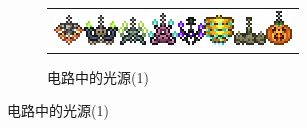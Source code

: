 \begin{figure}[!ht]
\begin{figure}[!htp]
{\begin{tabular}[b]{c}
\includegraphics{figures/Steampunk_Chandelier.png}\quad\includegraphics{figures/Blue_Dungeon_Chandelier.png}\quad\includegraphics{figures/Green_Dungeon_Chandelier.png}\quad\includegraphics{figures/Pink_Dungeon_Chandelier.png}\quad\includegraphics{figures/Obsidian_Chandelier.png}\quad\includegraphics{figures/Golden_Chandelier.png}\quad\includegraphics{figures/Bone_Chandelier.png}\quad\includegraphics{figures/Jackelier.png}
\end{tabular}}%
\caption{电路中的光源(1)}
\end{figure}


\end{figure}

